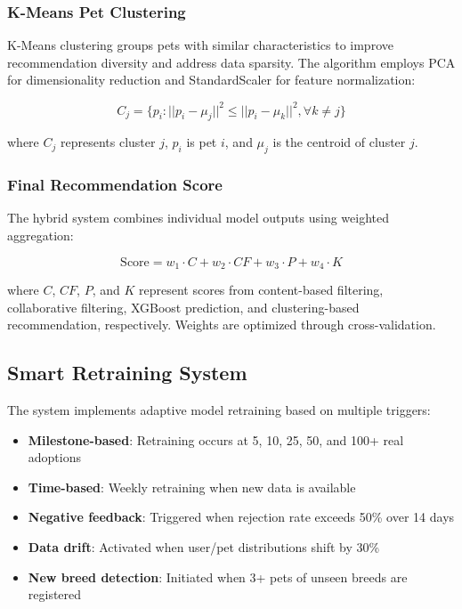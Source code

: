 \documentclass[conference]{IEEEtran}
\begin{document}
\subsubsection{K-Means Pet Clustering}
K-Means clustering groups pets with similar characteristics to improve recommendation diversity and address data sparsity. The algorithm employs PCA for dimensionality reduction and StandardScaler for feature normalization:

\begin{equation}
C_j = \{p_i : ||p_i - \mu_j||^2 \leq ||p_i - \mu_k||^2, \forall k \neq j\}
\end{equation}

where $C_j$ represents cluster $j$, $p_i$ is pet $i$, and $\mu_j$ is the centroid of cluster $j$.

\subsubsection{Final Recommendation Score}
The hybrid system combines individual model outputs using weighted aggregation:

\begin{equation}
\text{Score} = w_1 \cdot C + w_2 \cdot CF + w_3 \cdot P + w_4 \cdot K
\end{equation}

where $C$, $CF$, $P$, and $K$ represent scores from content-based filtering, collaborative filtering, XGBoost prediction, and clustering-based recommendation, respectively. Weights are optimized through cross-validation.

\subsection{Smart Retraining System}

The system implements adaptive model retraining based on multiple triggers:

\begin{itemize}
\item \textbf{Milestone-based}: Retraining occurs at 5, 10, 25, 50, and 100+ real adoptions
\item \textbf{Time-based}: Weekly retraining when new data is available
\item \textbf{Negative feedback}: Triggered when rejection rate exceeds 50\% over 14 days
\item \textbf{Data drift}: Activated when user/pet distributions shift by 30\%
\item \textbf{New breed detection}: Initiated when 3+ pets of unseen breeds are registered
\end{itemize}
\end{document}
